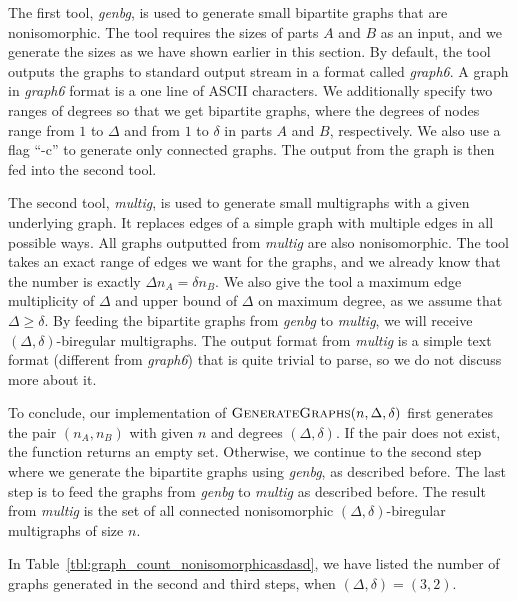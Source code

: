 The first tool, \emph{genbg}, is used to generate small bipartite graphs that are nonisomorphic.
The tool requires the sizes of parts $A$ and $B$ as an input, and we generate the sizes as we have shown earlier in this section.
By default, the tool outputs the graphs to standard output stream in a format called \emph{graph6}.
A graph in \emph{graph6} format is a one line of ASCII characters.
We additionally specify two ranges of degrees so that we get bipartite graphs, where the degrees of nodes range from $1$ to $\Delta$ and from $1$ to $\delta$ in parts $A$ and $B$, respectively.
We also use a flag ``-c'' to generate only connected graphs.
The output from the graph is then fed into the second tool.

The second tool, \emph{multig}, is used to generate small multigraphs with a given underlying graph.
It replaces edges of a simple graph with multiple edges in all possible ways.
All graphs outputted from \emph{multig} are also nonisomorphic.
The tool takes an exact range of edges we want for the graphs, and we already know that the number is exactly $\Delta n_A = \delta n_B$.
We also give the tool a maximum edge multiplicity of $\Delta$ and upper bound of $\Delta$ on maximum degree, as we assume that $\Delta \geq \delta$.
By feeding the bipartite graphs from \emph{genbg} to \emph{multig}, we will receive $(\Delta, \delta)$-biregular multigraphs.
The output format from \emph{multig} is a simple text format (different from \emph{graph6}) that is quite trivial to parse, so we do not discuss more about it.

To conclude, our implementation of $\textsc{GenerateGraphs}(n, \Delta, \delta)$ first generates the pair $(n_A, n_B)$ with given $n$ and degrees $(\Delta, \delta)$.
If the pair does not exist, the function returns an empty set.
Otherwise, we continue to the second step where we generate the bipartite graphs using \emph{genbg}, as described before.
The last step is to feed the graphs from \emph{genbg} to \emph{multig} as described before.
The result from \emph{multig} is the set of all connected nonisomorphic $(\Delta, \delta)$-biregular multigraphs of size $n$.

In Table~\ref{tbl:graph_count_nonisomorphicasdasd}, we have listed the number of graphs generated in the second and third steps, when $(\Delta, \delta)=(3,2)$.


